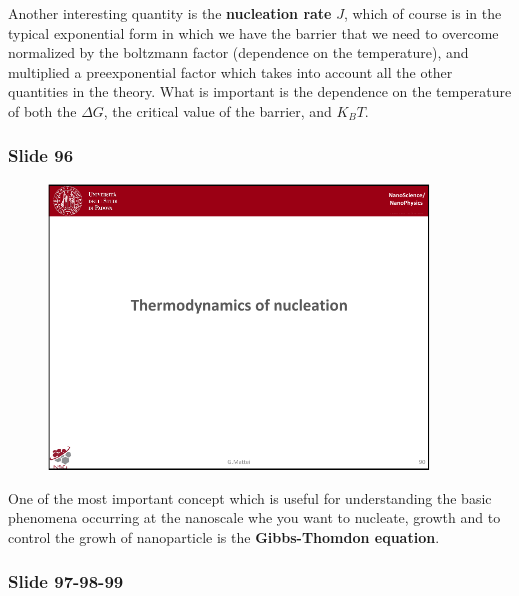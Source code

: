 \documentclass[../main/main.tex]{subfiles}
\begin{document}
Another interesting quantity is the \textbf{nucleation rate} \( J \), which of course is in the typical exponential form in which we have the barrier that we need to overcome normalized by the boltzmann factor (dependence on the temperature), and multiplied a preexponential factor which takes into account all the other quantities in the theory. What is important is the dependence on the temperature of both the \( \Delta G \), the critical value of the barrier, and \( K_B T \).

\newpage
\subsubsection{Slide 96}

\begin{figure}[h!]
\centering
\includegraphics[page=7,width=0.9\textwidth]{../lessons/pdf_file/6_lesson.pdf}
\end{figure}

One of the most important concept which is useful for understanding the basic phenomena occurring at the nanoscale whe you want to nucleate, growth and to control the growh of nanoparticle is the \textbf{Gibbs-Thomdon equation}.

\newpage
\subsubsection{Slide 97-98-99}
\end{document}
